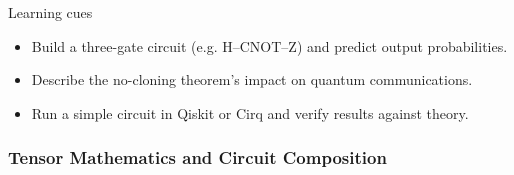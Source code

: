 Learning cues
\begin{itemize}
	\item Build a three-gate circuit (e.g. H–CNOT–Z) and predict output probabilities.
	\item Describe the no-cloning theorem’s impact on quantum communications.
	\item Run a simple circuit in Qiskit or Cirq and verify results against theory.
\end{itemize}





\subsubsection{Tensor Mathematics and Circuit Composition}

